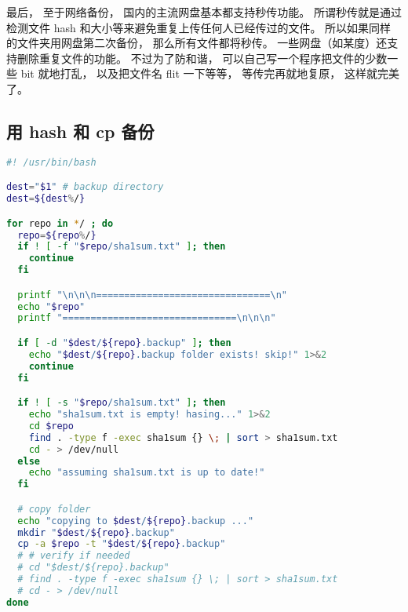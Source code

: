 最后， 至于网络备份， 国内的主流网盘基本都支持秒传功能。 所谓秒传就是通过检测文件 hash 和大小等来避免重复上传任何人已经传过的文件。 所以如果同样的文件夹用网盘第二次备份， 那么所有文件都将秒传。 一些网盘（如某度）还支持删除重复文件的功能。 不过为了防和谐， 可以自己写一个程序把文件的少数一些 bit 就地打乱， 以及把文件名 flit 一下等等， 等传完再就地复原， 这样就完美了。


\subsection{用 hash 和 cp 备份}

\begin{lstlisting}[language=bash]
#! /usr/bin/bash

dest="$1" # backup directory
dest=${dest%/}

for repo in */ ; do
  repo=${repo%/}
  if ! [ -f "$repo/sha1sum.txt" ]; then
    continue
  fi

  printf "\n\n\n===============================\n"
  echo "$repo"
  printf "===============================\n\n\n"

  if [ -d "$dest/${repo}.backup" ]; then
    echo "$dest/${repo}.backup folder exists! skip!" 1>&2
    continue
  fi

  if ! [ -s "$repo/sha1sum.txt" ]; then
    echo "sha1sum.txt is empty! hasing..." 1>&2
    cd $repo
    find . -type f -exec sha1sum {} \; | sort > sha1sum.txt
    cd - > /dev/null
  else
    echo "assuming sha1sum.txt is up to date!"
  fi

  # copy folder
  echo "copying to $dest/${repo}.backup ..."
  mkdir "$dest/${repo}.backup"
  cp -a $repo -t "$dest/${repo}.backup"
  # # verify if needed
  # cd "$dest/${repo}.backup"
  # find . -type f -exec sha1sum {} \; | sort > sha1sum.txt
  # cd - > /dev/null
done
\end{lstlisting}
